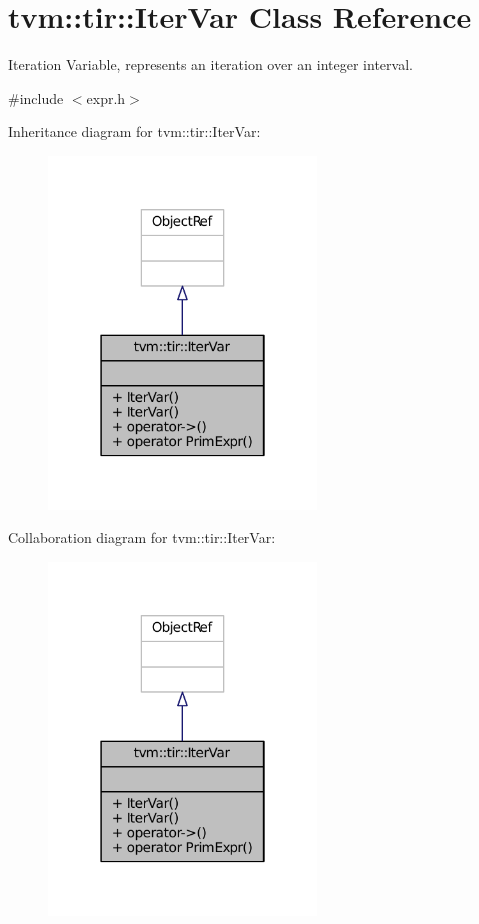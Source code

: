 \hypertarget{classtvm_1_1tir_1_1IterVar}{}\section{tvm\+:\+:tir\+:\+:Iter\+Var Class Reference}
\label{classtvm_1_1tir_1_1IterVar}


Iteration Variable, represents an iteration over an integer interval.  




{\ttfamily \#include $<$expr.\+h$>$}



Inheritance diagram for tvm\+:\+:tir\+:\+:Iter\+Var\+:
\nopagebreak
\begin{figure}[H]
\begin{center}
\leavevmode
\includegraphics[width=202pt]{classtvm_1_1tir_1_1IterVar__inherit__graph}
\end{center}
\end{figure}


Collaboration diagram for tvm\+:\+:tir\+:\+:Iter\+Var\+:
\nopagebreak
\begin{figure}[H]
\begin{center}
\leavevmode
\includegraphics[width=202pt]{classtvm_1_1tir_1_1IterVar__coll__graph}
\end{center}
\end{figure}
